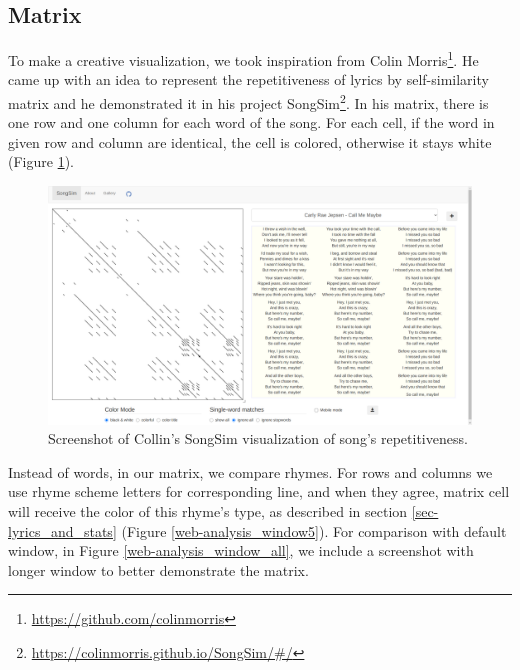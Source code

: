 \subsection{Matrix}
To make a creative visualization, we took inspiration from Colin Morris\footnote{\url{https://github.com/colinmorris}}. He came up with an idea to represent the repetitiveness of lyrics by self-similarity matrix and he demonstrated it in his project SongSim\footnote{\url{https://colinmorris.github.io/SongSim/\#/}}. In his matrix, there is one row and one column for each word of the song. For each cell, if the word in given row and column are identical, the cell is colored, otherwise it stays white (Figure \ref{songsim}).

\begin{figure}[h]\centering
	\includegraphics[scale=0.2]{../img/songsim.png}
	\caption{Screenshot of Collin's SongSim visualization of song's repetitiveness.}
	\label{songsim}
\end{figure}

Instead of words, in our matrix, we compare rhymes. For rows and columns we use rhyme scheme letters for corresponding line, and when they agree, matrix cell will receive the color of this rhyme's type, as described in section \ref{sec-lyrics_and_stats} (Figure \ref{web-analysis_window5}). For comparison with default window, in Figure \ref{web-analysis_window_all}, we include a screenshot with longer window to better demonstrate the matrix.


